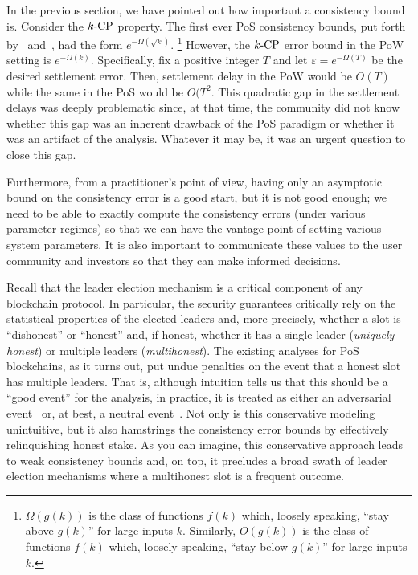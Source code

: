 In the previous section, 
we have pointed out how important a consistency bound is. 
Consider the ${k}\text{-}\mathrm{CP}$ property.
The first ever PoS consistency bounds, 
put forth by~\citet{Ouroboros} and~\citet{SnowWhite}, 
had the form $e^{-\Omega(\sqrt{k})}$. \footnote{
  $\Omega(g(k))$ is the class of functions $f(k)$ 
  which, loosely speaking, 
  ``stay above $g(k)$'' for large inputs $k$.
  Similarly, $O(g(k))$ is the class of functions $f(k)$ 
  which, loosely speaking, 
  ``stay below $g(k)$'' for large inputs $k$.
}
However, the ${k}\text{-}\mathrm{CP}$ error bound in the PoW setting is $e^{-\Omega(k)}$. 
Specifically, fix a positive integer $T$ and let $\varepsilon = e^{-\Omega(T)}$ 
be the desired settlement error. 
Then, settlement delay in the PoW would be $O(T)$ while 
the same in the PoS would be $O(T^2$. 
This quadratic gap in the settlement delays 
was deeply problematic since, 
at that time, 
the community did not know whether this gap 
was an inherent drawback of the PoS paradigm 
or whether it was an artifact of the analysis. 
Whatever it may be, 
it was an urgent question to close this gap. 

Furthermore, from a practitioner's point of view, 
having only an asymptotic bound on the consistency error is a good start, 
but it is not good enough; 
we need to be able to exactly compute the consistency errors 
(under various parameter regimes) 
so that we can have the vantage point of setting 
various system parameters. 
It is also important to communicate these values 
to the user community and investors 
so that they can make informed decisions.


Recall that the leader election mechanism is a 
critical component of any blockchain protocol. 
In particular, 
the security guarantees critically rely on the 
statistical properties of the elected leaders 
and, more precisely, 
whether a slot is ``dishonest'' or ``honest'' 
and, if honest, whether it has a single leader (\emph{uniquely honest}) 
or multiple leaders (\emph{multihonest}).
The existing analyses for PoS blockchains, 
as it turns out, 
put undue penalties on the event that a honest slot has multiple leaders. 
That is, although intuition tells us that this should be a ``good event'' for the analysis, 
in practice, it is treated as either an adversarial event~\cite{Ouroboros,Praos,Genesis} 
or, at best, a neutral event~\cite{SnowWhite,Sleepy}. 
Not only is this conservative modeling unintuitive, 
but it also hamstrings the consistency error bounds 
by effectively relinquishing honest stake. 
As you can imagine, this conservative approach leads to weak consistency bounds 
and, on top, it precludes a broad swath of leader election mechanisms 
where a multihonest slot is a frequent outcome.


